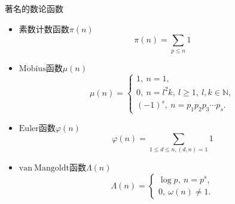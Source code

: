 \begin{example}{著名的数论函数}
\begin{itemize}
\item 素数计数函数$\pi(n)$
\begin{equation}
\pi(n)=\sum_{p\leq n} 1
\end{equation}
\item $\mathrm{M\ddot{o}bius}$函数$\mu(n)$
\begin{equation}
\mu(n)=
\begin{cases}
1,\ n=1,\\
0,\ n=l^2k,\ l\geq 1,\ l,k\in\mathbb{N},\\
(-1)^s,\ n=p_1p_2p_3\cdots p_s.
\end{cases}
\end{equation}
\item $\mathrm{Euler}$函数$\varphi(n)$
\begin{equation}
\varphi(n)=\sum_{1\leq d\leq n,(d,n)=1}1
\end{equation}
\item $\mathrm{van\ Mangoldt}$函数$\Lambda(n)$
\begin{equation}
\varLambda(n)=
\begin{cases}
\log p,\ n=p^s,\\
0,\ \omega(n)\neq 1.
\end{cases}
\end{equation}
\end{itemize}

\end{example}